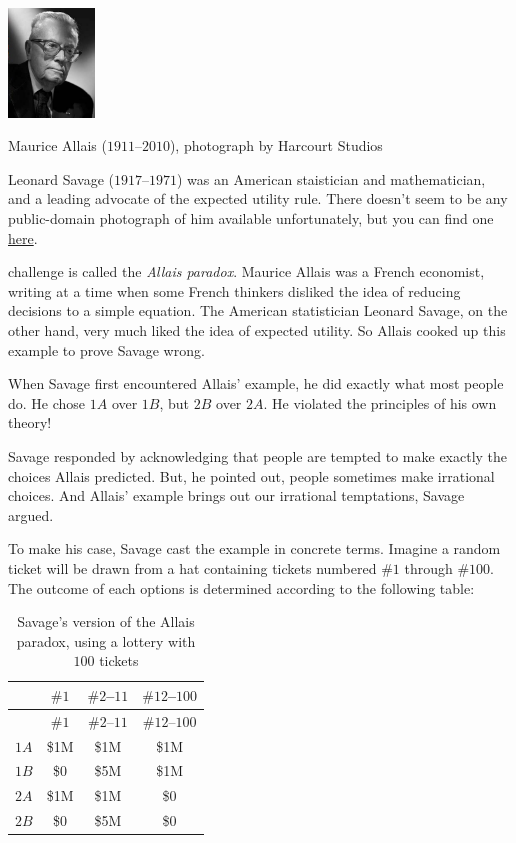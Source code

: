 \documentclass[justified]{tufte-book}
\theoremstyle{definition}
\theoremstyle{definition}
\theoremstyle{definition}
\theoremstyle{remark}
\begin{document}
\begin{marginfigure}
\includegraphics[width=0.91in]{img/allais} \caption[Maurice Allais ($1911$--$2010$), photograph by Harcourt Studios]{Maurice Allais ($1911$--$2010$), photograph by Harcourt Studios}\label{fig:unnamed-chunk-113}
\end{marginfigure}
\begin{marginfigure}
Leonard Savage (\(1917\)--\(1971\)) was an American staistician and
mathematician, and a leading advocate of the expected utility rule.
There doesn't seem to be any public-domain photograph of him available
unfortunately, but you can find one
\href{http://policonomics.com/leonard-savage/}{here}.
\end{marginfigure}

 challenge is called the \emph{Allais paradox}. Maurice
Allais was a French economist, writing at a time when some French
thinkers disliked the idea of reducing decisions to a simple equation.
The American statistician Leonard Savage, on the other hand, very much
liked the idea of expected utility. So Allais cooked up this example to
prove Savage wrong.

When Savage first encountered Allais' example, he did exactly what most
people do. He chose \(1A\) over \(1B\), but \(2B\) over \(2A\). He
violated the principles of his own theory!

Savage responded by acknowledging that people are tempted to make
exactly the choices Allais predicted. But, he pointed out, people
sometimes make irrational choices. And Allais' example brings out our
irrational temptations, Savage argued.

To make his case, Savage cast the example in concrete terms. Imagine a
random ticket will be drawn from a hat containing tickets numbered
\(\#1\) through \(\#100\). The outcome of each options is determined
according to the following table:

\begin{longtable}[]{@{}lccc@{}}
\caption{\label{tab:unnamed-chunk-115}Savage's version of the Allais
paradox, using a lottery with \(100\) tickets}\tabularnewline
\toprule
& \(\#1\) & \(\#2\)--\(11\) & \(\#12\)--\(100\)\tabularnewline
\midrule
\endfirsthead
\toprule
& \(\#1\) & \(\#2\)--\(11\) & \(\#12\)--\(100\)\tabularnewline
\midrule
\endhead
\(1A\) & \$1M & \$1M & \$1M\tabularnewline
\(1B\) & \$0 & \$5M & \$1M\tabularnewline
\(2A\) & \$1M & \$1M & \$0\tabularnewline
\(2B\) & \$0 & \$5M & \$0\tabularnewline
\bottomrule
\end{longtable}
\end{document}
